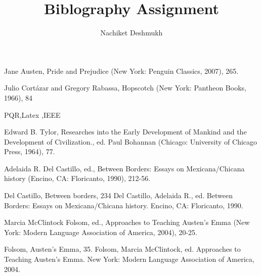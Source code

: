 \documentclass[11pt,a4paper]{report}
\author{Nachiket Deshmukh}
\title{\textbf{Biblography Assignment}}
\begin{document}
\maketitle


\begin{thebibliography} {}

Jane Austen, Pride and Prejudice (New York: Penguin Classics, 2007), 265.

 Julio Cortázar and Gregory Rabassa, Hopscotch (New York: Pantheon Books, 1966), 84

 PQR,Latex ,IEEE

 Edward B. Tylor, Researches into the Early Development of Mankind and the Development of Civilization., ed. Paul Bohannan (Chicago: University of Chicago Press, 1964), 77.

 Adelaida R. Del Castillo, ed., Between Borders: Essays on Mexicana/Chicana history (Encino, CA: Floricanto, 1990), 212-56.

Del Castillo, Between borders, 234
Del Castillo, Adelaida R., ed. Between Borders: Essays on Mexicana/Chicana history. Encino, CA: Floricanto, 1990.

  Marcia McClintock Folsom, ed., Approaches to Teaching Austen's Emma (New York: Modern Language Association of America, 2004), 20-25.

 Folsom, Austen's Emma, 35.
Folsom, Marcia McClintock, ed. Approaches to Teaching Austen's Emma. New York: Modern Language Association of America, 2004.


\end{thebibliography} 
\end{document}
